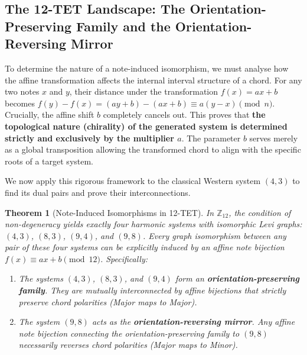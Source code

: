 \documentclass[11pt,letterpaper]{amsart}
\newcommand{\Z}{\mathbb{Z}}
\newtheorem{theorem}{Theorem}
\begin{document}
\subsection{The 12-TET Landscape: The Orientation-Preserving Family and the Orientation-Reversing Mirror}

To determine the nature of a note-induced isomorphism, we must analyse how the affine transformation affects the internal interval structure of a chord. For any two notes $x$ and $y$, their distance under the transformation $f(x) = ax + b$ becomes $f(y) - f(x) = (ay + b) - (ax + b) \equiv a(y - x) \pmod{n}$. Crucially, the affine shift $b$ completely cancels out. This proves that \textbf{the topological nature (chirality) of the generated system is determined strictly and exclusively by the multiplier $a$}. The parameter $b$ serves merely as a global transposition allowing the transformed chord to align with the specific roots of a target system.

We now apply this rigorous framework to the classical Western system $(4,3)$ to find its dual pairs and prove their interconnections. 

\begin{theorem}[Note-Induced Isomorphisms in 12-TET]
In $\Z_{12}$, the condition of non-degeneracy yields exactly four harmonic systems with isomorphic Levi graphs: $(4,3)$, $(8,3)$, $(9,4)$, and $(9,8)$. Every graph isomorphism between any pair of these four systems can be explicitly induced by an affine note bijection $f(x) \equiv ax + b \pmod{12}$. Specifically:
\begin{enumerate}
    \item The systems $(4,3)$, $(8,3)$, and $(9,4)$ form an \textbf{orientation-preserving family}. They are mutually interconnected by affine bijections that strictly preserve chord polarities (Major maps to Major). 
    \item The system $(9,8)$ acts as the \textbf{orientation-reversing mirror}. Any affine note bijection connecting the orientation-preserving family to $(9,8)$ necessarily reverses chord polarities (Major maps to Minor).
\end{enumerate}
\end{theorem}
\end{document}
